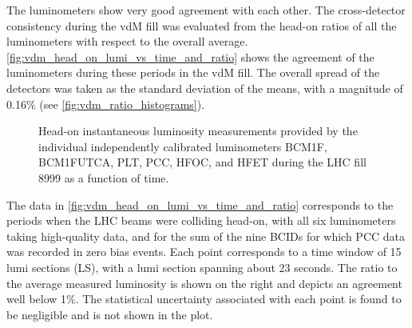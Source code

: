 The luminometers show very good agreement with each other. The cross-detector consistency during the vdM fill was evaluated from the head-on ratios of all the luminometers with respect to the overall average. \autoref{fig:vdm_head_on_lumi_vs_time_and_ratio} shows the agreement of the luminometers during these periods in the vdM fill. The overall spread of the detectors was taken as the standard deviation of the means, with a magnitude of 0.16\% (see \autoref{fig:vdm_ratio_histograms}).

\begin{figure}[!htb]
	\centering
	\caption[Comparison of head-on luminosity measurements]{Head-on instantaneous luminosity measurements provided by the individual independently calibrated luminometers BCM1F, BCM1FUTCA, PLT, PCC, HFOC, and HFET during the LHC fill 8999 as a function of time.}
	\label{fig:vdm_head_on_lumi_vs_time_and_ratio}
\end{figure}

The data in \autoref{fig:vdm_head_on_lumi_vs_time_and_ratio} corresponds to the periods when the LHC beams were colliding head-on, with all six luminometers taking high-quality data, and for the sum of the nine BCIDs for which PCC data was recorded in zero bias events. Each point corresponds to a time window of 15 lumi sections (LS), with a lumi section spanning about 23 seconds. The ratio to the average measured luminosity is shown on the right and depicts an agreement well below 1\%. The statistical uncertainty associated with each point is found to be negligible and is not shown in the plot.

